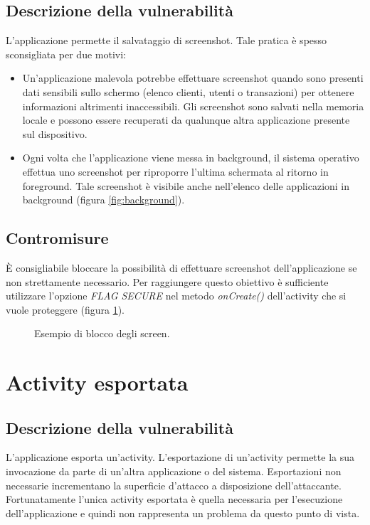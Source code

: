 \subsection{Descrizione della vulnerabilità}
L'applicazione permette il salvataggio di screenshot. Tale pratica è spesso sconsigliata per due motivi:
\begin{itemize}
	\item Un'applicazione malevola potrebbe effettuare screenshot quando sono presenti dati sensibili sullo schermo (elenco clienti, utenti o transazioni) per ottenere informazioni altrimenti inaccessibili. Gli screenshot sono salvati nella memoria locale e possono essere recuperati da qualunque altra applicazione presente sul dispositivo.
	\item Ogni volta che l'applicazione viene messa in background, il sistema operativo effettua uno screenshot per riproporre l'ultima schermata al ritorno in foreground. Tale screenshot è visibile anche nell'elenco delle applicazioni in background (figura \ref{fig:background}).
\end{itemize}

\subsection{Contromisure}
È consigliabile bloccare la possibilità di effettuare screenshot dell'applicazione se non strettamente necessario. Per raggiungere questo obiettivo è sufficiente utilizzare l'opzione \emph{FLAG SECURE} nel metodo \emph{onCreate()} dell'activity che si vuole proteggere (figura \ref{fig:screen}).

\begin{figure}[h]
	\centering 
	\caption{Esempio di blocco degli screen.}
	\label{fig:screen}
\end{figure}

\section{Activity esportata}

\subsection{Descrizione della vulnerabilità}
L'applicazione esporta un'activity. L'esportazione di un'activity permette la sua invocazione da parte di un'altra applicazione o del sistema. Esportazioni non necessarie incrementano la superficie d'attacco a disposizione dell'attaccante. Fortunatamente l'unica activity esportata è quella necessaria per l'esecuzione dell'applicazione e quindi non rappresenta un problema da questo punto di vista. 

